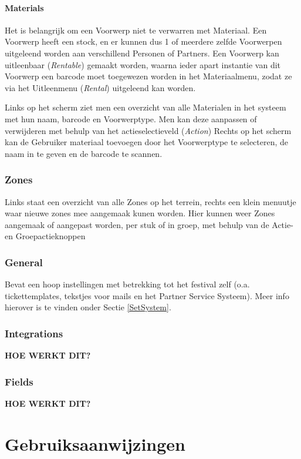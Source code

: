 \documentclass[]{memoir}
\begin{document}
\subsubsection{Materials} \label{Materials}
Het is belangrijk om een Voorwerp niet te verwarren met Materiaal. Een Voorwerp heeft een stock, en er kunnen dus 1 of meerdere zelfde Voorwerpen uitgeleend worden aan verschillend Personen of Partners. Een Voorwerp kan uitleenbaar (\textsl{Rentable}) gemaakt worden, waarna ieder apart instantie van dit Voorwerp een barcode moet toegewezen worden in het Materiaalmenu, zodat ze via het Uitleenmenu (\textsl{Rental}) uitgeleend kan worden.

Links op het scherm ziet men een overzicht van alle Materialen in het systeem met hun naam, barcode en Voorwerptype. Men kan deze aanpassen of verwijderen met behulp van het actieselectieveld (\textsl{Action})
Rechts op het scherm kan de Gebruiker materiaal toevoegen door het Voorwerptype te selecteren, de naam in te geven en de barcode te scannen.
\subsection{Zones} \label{Zones}
Links staat een overzicht van alle Zones op het terrein, rechts een klein menuutje waar nieuwe zones mee aangemaak kunen worden. Hier kunnen weer Zones aangemaak of aangepast worden, per stuk of in groep, met behulp van de Actie- en Groepactieknoppen

\subsection{General} \label{General}
Bevat een hoop instellingen met betrekking tot het festival zelf (o.a. tickettemplates, tekstjes voor mails en het Partner Service Systeem). Meer info hierover is te vinden onder Sectie \ref{SetSystem}.

\subsection{Integrations} \label{Integrations}
\textbf{HOE WERKT DIT?}

\subsection{Fields} \label{Fields}
\textbf{HOE WERKT DIT?}

\chapter{Gebruiksaanwijzingen} \label{Instructions}
\end{document}
